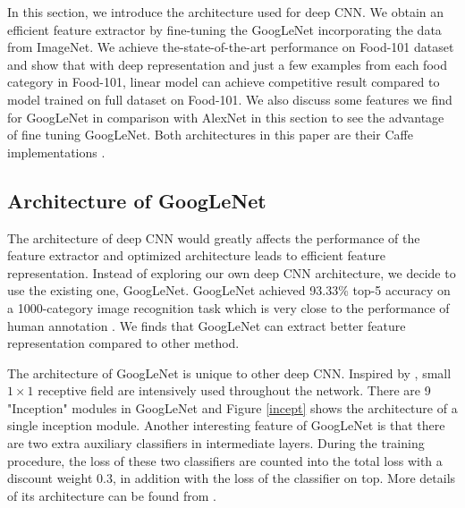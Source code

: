 ﻿In this section, we introduce the architecture used for deep CNN. We obtain an efficient feature extractor by fine-tuning the GoogLeNet incorporating the data from ImageNet. We achieve the-state-of-the-art performance on Food-101 dataset and show that with deep representation and just a few examples from each food category in Food-101, linear model can achieve competitive result compared to model trained on full dataset on Food-101. We also discuss some features we find for GoogLeNet in comparison with AlexNet \cite{krizhevsky2012imagenet} in this section to see the advantage of fine tuning GoogLeNet. Both architectures in this paper are their Caffe implementations \cite{jia2014caffe}.
\subsection{Architecture of GoogLeNet}
The architecture of deep CNN would greatly affects the performance of the feature extractor and optimized architecture leads to efficient feature representation.
Instead of exploring our own deep CNN architecture, we decide to use the existing one, GoogLeNet. GoogLeNet achieved 93.33\% top-5 accuracy on a 1000-category image recognition task which is very close to the performance of human annotation \cite{szegedy2014going}. We finds that GoogLeNet can extract better feature representation compared to other method.

 The architecture of GoogLeNet is unique to other deep CNN. Inspired by \cite{linNiN}, small $1\times 1$ receptive field are intensively used throughout the network. There are 9 "Inception" modules in GoogLeNet and Figure \ref{incept} shows the architecture of a single inception module. Another interesting feature of GoogLeNet is that there are two extra auxiliary classifiers in intermediate layers. During the training procedure, the loss of these two classifiers are counted into the total loss with a discount weight 0.3, in addition with the loss of the classifier on top. More details of its architecture can be found from \cite{szegedy2014going}.

